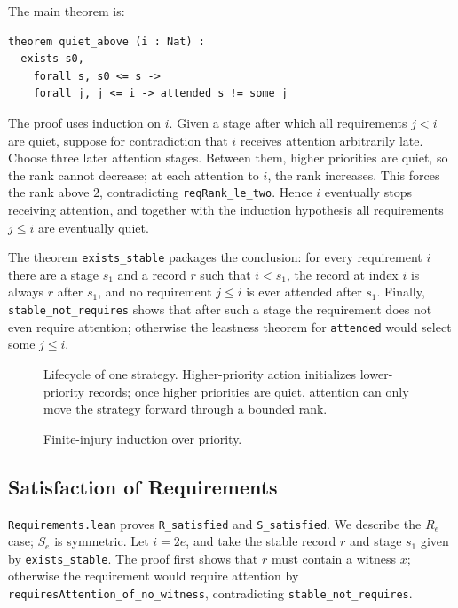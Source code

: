 The main theorem is:

\begin{lstlisting}
theorem quiet_above (i : Nat) :
  exists s0,
    forall s, s0 <= s ->
    forall j, j <= i -> attended s != some j
\end{lstlisting}

The proof uses induction on \(i\).  Given a stage after which all
requirements \(j<i\) are quiet, suppose for contradiction that \(i\)
receives attention arbitrarily late.  Choose three later attention stages.
Between them, higher priorities are quiet, so the rank cannot decrease;
at each attention to \(i\), the rank increases.  This forces the rank above
\(2\), contradicting \texttt{reqRank_le_two}.  Hence \(i\) eventually stops
receiving attention, and together with the induction hypothesis all
requirements \(j\leq i\) are eventually quiet.

The theorem \texttt{exists_stable} packages the conclusion: for every
requirement \(i\) there are a stage \(s_1\) and a record \(r\) such that
\(i<s_1\), the record at index \(i\) is always \(r\) after \(s_1\), and no
requirement \(j\leq i\) is ever attended after \(s_1\).  Finally,
\texttt{stable_not_requires} shows that after such a stage the requirement
does not even require attention; otherwise the leastness theorem for
\texttt{attended} would select some \(j\leq i\).

\begin{figure}
\centering

\caption{Lifecycle of one strategy.  Higher-priority action initializes
lower-priority records; once higher priorities are quiet, attention can
only move the strategy forward through a bounded rank.}
\end{figure}

\begin{figure}
\centering

\caption{Finite-injury induction over priority.}
\end{figure}

\subsection{Satisfaction of Requirements}

\texttt{Requirements.lean} proves \texttt{R_satisfied} and
\texttt{S_satisfied}.  We describe the \(R_e\) case; \(S_e\) is symmetric.
Let \(i=2e\), and take the stable record \(r\) and stage \(s_1\) given by
\texttt{exists_stable}.  The proof first shows that \(r\) must contain a
witness \(x\); otherwise the requirement would require attention by
\texttt{requiresAttention_of_no_witness}, contradicting
\texttt{stable_not_requires}.

